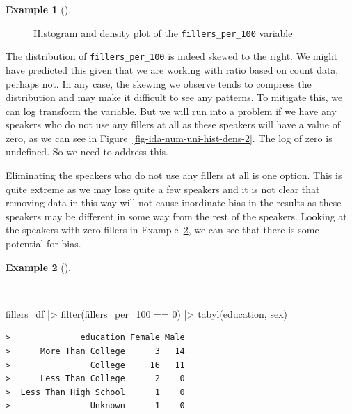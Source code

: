 \documentclass[
  letterpaper,
  DIV=11,
  numbers=noendperiod]{scrreprt}
\newenvironment{Shaded}{\begin{snugshade}}{\end{snugshade}}
\newcommand{\DecValTok}[1]{\textcolor[rgb]{0.00,0.00,0.00}{#1}}
\newcommand{\FunctionTok}[1]{\textcolor[rgb]{0.00,0.00,0.00}{#1}}
\newcommand{\NormalTok}[1]{\textcolor[rgb]{0.00,0.00,0.00}{#1}}
\newcommand{\SpecialCharTok}[1]{\textcolor[rgb]{0.00,0.00,0.00}{#1}}
\theoremstyle{definition}
\newtheorem{example}{Example}[chapter]
\theoremstyle{remark}
\begin{document}
\begin{example}[]
\begin{figure}[H]
\begin{minipage}{0.50\linewidth}


\end{minipage}%

\caption{\label{fig-ida-num-uni-hist-dens}Histogram and density plot of
the \texttt{fillers\_per\_100} variable}

\end{figure}%

\end{example}

The distribution of \texttt{fillers\_per\_100} is indeed skewed to the
right. We might have predicted this given that we are working with ratio
based on count data, perhaps not. In any case, the skewing we observe
tends to compress the distribution and may make it difficult to see any
patterns. To mitigate this, we can log transform the variable. But we
will run into a problem if we have any speakers who do not use any
fillers at all as these speakers will have a value of zero, as we can
see in Figure~\ref{fig-ida-num-uni-hist-dens-2}. The log of zero is
undefined. So we need to address this.

Eliminating the speakers who do not use any fillers at all is one
option. This is quite extreme as we may lose quite a few speakers and it
is not clear that removing data in this way will not cause inordinate
bias in the results as these speakers may be different in some way from
the rest of the speakers. Looking at the speakers with zero fillers in
Example~\ref{exm-ida-num-uni-zero-fillers}, we can see that there is
some potential for bias.

\begin{example}[]\protect\hypertarget{exm-ida-num-uni-zero-fillers}{}\label{exm-ida-num-uni-zero-fillers}

~

\begin{Shaded}
\begin{Highlighting}[]
\NormalTok{fillers\_df }\SpecialCharTok{|\textgreater{}}
  \FunctionTok{filter}\NormalTok{(fillers\_per\_100 }\SpecialCharTok{==} \DecValTok{0}\NormalTok{) }\SpecialCharTok{|\textgreater{}}
  \FunctionTok{tabyl}\NormalTok{(education, sex)}
\end{Highlighting}
\end{Shaded}

\begin{verbatim}
>              education Female Male
>      More Than College      3   14
>                College     16   11
>      Less Than College      2    0
>  Less Than High School      1    0
>                Unknown      1    0
\end{verbatim}

\end{example}
\end{document}
